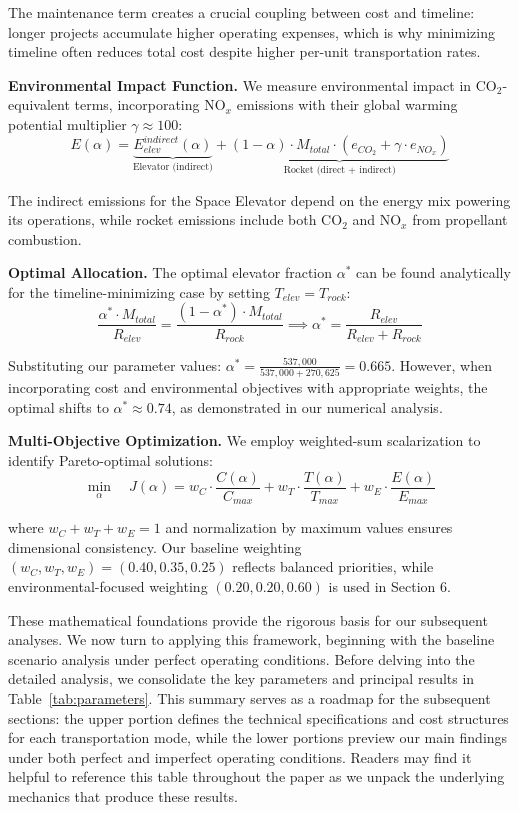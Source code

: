 \documentclass[12pt]{article}
\begin{document}
	The maintenance term creates a crucial coupling between cost and timeline: longer projects accumulate higher operating expenses, which is why minimizing timeline often reduces total cost despite higher per-unit transportation rates.
	
	\textbf{Environmental Impact Function.} We measure environmental impact in CO$_2$-equivalent terms, incorporating NO$_x$ emissions with their global warming potential multiplier $\gamma \approx 100$:
	\begin{equation}
		E(\alpha) = \underbrace{E_{elev}^{indirect}(\alpha)}_{\text{Elevator (indirect)}} + \underbrace{(1-\alpha) \cdot M_{total} \cdot (e_{CO_2} + \gamma \cdot e_{NO_x})}_{\text{Rocket (direct + indirect)}}
	\end{equation}
	
	The indirect emissions for the Space Elevator depend on the energy mix powering its operations, while rocket emissions include both CO$_2$ and NO$_x$ from propellant combustion.
	
	\textbf{Optimal Allocation.} The optimal elevator fraction $\alpha^*$ can be found analytically for the timeline-minimizing case by setting $T_{elev} = T_{rock}$:
	\begin{equation}
		\frac{\alpha^* \cdot M_{total}}{R_{elev}} = \frac{(1-\alpha^*) \cdot M_{total}}{R_{rock}} \implies \alpha^* = \frac{R_{elev}}{R_{elev} + R_{rock}}
	\end{equation}
	
	Substituting our parameter values: $\alpha^* = \frac{537,000}{537,000 + 270,625} = 0.665$. However, when incorporating cost and environmental objectives with appropriate weights, the optimal shifts to $\alpha^* \approx 0.74$, as demonstrated in our numerical analysis.
	
	\textbf{Multi-Objective Optimization.} We employ weighted-sum scalarization to identify Pareto-optimal solutions:
	\begin{equation}
		\min_{\alpha} \quad J(\alpha) = w_C \cdot \frac{C(\alpha)}{C_{max}} + w_T \cdot \frac{T(\alpha)}{T_{max}} + w_E \cdot \frac{E(\alpha)}{E_{max}}
	\end{equation}
	
	\noindent where $w_C + w_T + w_E = 1$ and normalization by maximum values ensures dimensional consistency. Our baseline weighting $(w_C, w_T, w_E) = (0.40, 0.35, 0.25)$ reflects balanced priorities, while environmental-focused weighting $(0.20, 0.20, 0.60)$ is used in Section 6.
	
	These mathematical foundations provide the rigorous basis for our subsequent analyses. We now turn to applying this framework, beginning with the baseline scenario analysis under perfect operating conditions.
	Before delving into the detailed analysis, we consolidate the key parameters and principal results in Table~\ref{tab:parameters}. This summary serves as a roadmap for the subsequent sections: the upper portion defines the technical specifications and cost structures for each transportation mode, while the lower portions preview our main findings under both perfect and imperfect operating conditions. Readers may find it helpful to reference this table throughout the paper as we unpack the underlying mechanics that produce these results.
	
\end{document}
